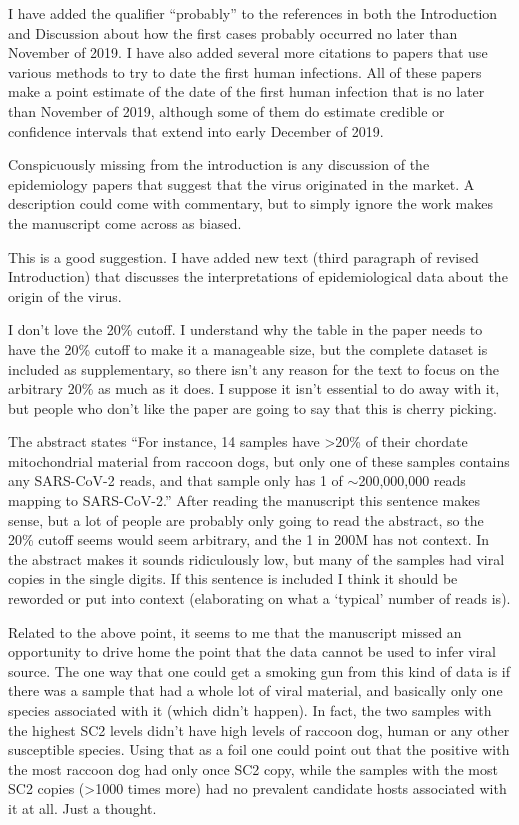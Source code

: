 \documentclass[11pt, oneside]{article}   	%
\newcommand{\response}[1]{{\color{black}#1}}
\begin{document}
\response{
I have added the qualifier ``probably'' to the references in both the Introduction and Discussion about how the first cases probably occurred no later than November of 2019.
I have also added several more citations to papers that use various methods to try to date the first human infections.
All of these papers make a point estimate of the date of the first human infection that is no later than November of 2019, although some of them do estimate credible or confidence intervals that extend into early December of 2019.
}

Conspicuously missing from the introduction is any discussion of the epidemiology papers that suggest that the virus originated in the market.  A description could come with commentary, but to simply ignore the work makes the manuscript come across as biased.

\response{
This is a good suggestion.
I have added new text (third paragraph of revised Introduction) that discusses the interpretations of epidemiological data about the origin of the virus.
}

I don’t love the 20\% cutoff.  I understand why the table in the paper needs to have the 20\% cutoff to make it a manageable size, but the complete dataset is included as supplementary, so there isn’t any reason for the text to focus on the arbitrary 20\% as much as it does.  I suppose it isn’t essential to do away with it, but people who don’t like the paper are going to say that this is cherry picking.

The abstract states ``For instance, 14 samples have >20\% of their chordate mitochondrial material from raccoon dogs, but only one of these samples contains any SARS-CoV-2 reads, and that sample only has 1 of $\sim$200,000,000 reads mapping to SARS-CoV-2.''  After reading the manuscript this sentence makes sense, but a lot of people are probably only going to read the abstract, so the 20\% cutoff seems would seem arbitrary, and the 1 in 200M has not context.  In the abstract makes it sounds ridiculously low, but many of the samples had viral copies in the single digits.  If this sentence is included I think it should be reworded or put into context (elaborating on what a `typical' number of reads is).

Related to the above point, it seems to me that the manuscript missed an opportunity to drive home the point that the data cannot be used to infer viral source.  The one way that one could get a smoking gun from this kind of data is if there was a sample that had a whole lot of viral material, and basically only one species associated with it (which didn’t happen).  In fact, the two samples with the highest SC2 levels didn’t have high levels of raccoon dog, human or any other susceptible species.  Using that as a foil one could point out that the positive with the most raccoon dog had only once SC2 copy, while the samples with the most SC2 copies (>1000 times more) had no prevalent candidate hosts associated with it at all.  Just a thought.
\end{document}
